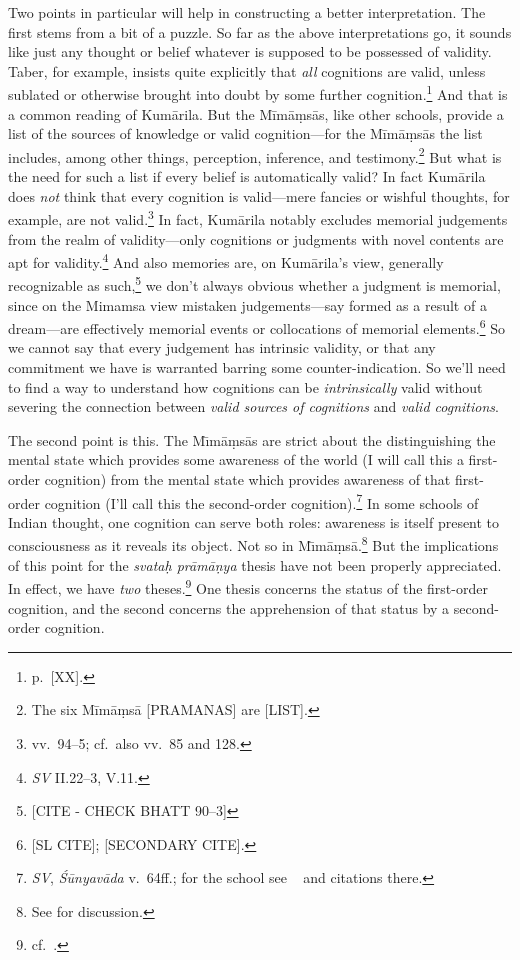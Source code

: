 ﻿\documentclass[11pt]{amsart}
\begin{document}
Two points in particular will help in constructing a better interpretation. The first stems from a bit of a puzzle. So far as the above interpretations go, it sounds like just any thought or belief whatever is supposed to be possessed of validity. Taber, for example, insists quite explicitly that \emph{all} cognitions are valid, unless sublated or otherwise brought into doubt by some further cognition.\footnote{p.~[XX].} And that is a common reading of Kum\=arila. But the M\=im\=a\d ms\=as, like other schools, provide a list of the sources of knowledge or valid cognition---for the M\=im\=a\d ms\=as the list includes, among other things, perception, inference, and testimony.\footnote{The six M\=im\=a\d ms\=a [PRAMANAS] are [LIST].\label{thesix} } But what is the need for such a list if every belief is automatically valid? In fact Kum\=arila does \emph{not} think that every cognition is valid---mere fancies or wishful thoughts, for example, are not valid.\footnote{vv.~94--5; cf.~also vv.~85 and 128.} In fact, Kum\=arila notably excludes memorial judgements from the realm of validity---only cognitions or judgments with novel contents are apt for validity.\footnote{\emph{SV} II.22--3, V.11.} And also memories are, on Kum\=arila's view, generally recognizable as such,\footnote{[CITE - CHECK BHATT 90--3]} we don't always obvious whether a judgment is memorial, since on the Mimamsa view mistaken judgements---say formed as a result of a dream---are effectively memorial events or collocations of memorial elements.\footnote{[SL CITE]; [SECONDARY CITE].} So we cannot say that every judgement has intrinsic validity, or that any commitment we have is warranted barring some counter-indication. So we'll need to find a way to understand how cognitions can be \emph{intrinsically} valid without severing the connection between \emph{valid sources of cognitions} and \emph{valid cognitions}.

The second point is this. The M\={\i}m\=a\d ms\=as are strict about the distinguishing the mental state which provides some awareness of the world (I will call this a first-order cognition) from the mental state which provides awareness of that first-order cognition (I'll call this the second-order cognition).\footnote{\emph{SV}, \emph{\'S\=unyav\=ada} v.~64ff.; for the school see ~\citet[pp.~20--1]{keith1921karma} and citations there.} In some schools of Indian thought, one cognition can serve both roles: awareness is itself present to consciousness as it reveals its object. Not so in M\={\i}m\=a\d ms\=a.\footnote{See \citet[pref., chs.~IV, X]{sen1984concept} for discussion.} But the implications of this point for the \emph{svata\d h pr\=am\=a\d nya} thesis have not been properly appreciated. In effect, we have \emph{two} theses.\footnote{cf.~\citet[p.~41]{chatterjea2003svatah}.} One thesis concerns the status of the first-order cognition, and the second concerns the apprehension of that status by a second-order cognition.
\end{document}
